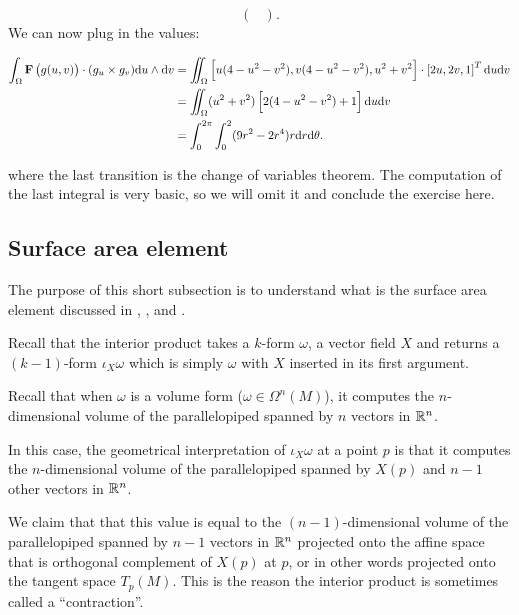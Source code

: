 \documentclass[11pt,a4paper]{article}
\begin{document}
\begin{solution}
\[\begin{pmatrix}
    \end{pmatrix}.
  \]
  We can now plug in the values:
  \begin{small}
  \begin{align*}
    \int_{\Omega}
    \vec F\del{g(u,v)} \cdot (g_u \times g_v) \du \wedge \dv &=
    \iint_{\Omega}
    \left[u (4 - u^2 - v^2),v (4 - u^2 - v^2),u^2 + v^2\right] \cdot
    \left[2u,2v,1\right]^T \du \dv \\ &=
    \iint_{\Omega} (u^2 + v^2) \left[2 (4 - u^2 - v^2) + 1\right] \du \dv
                                  \\&=
    \int_{0}^{2\pi} \int_{0}^{2} (9r^2 - 2r^4) r \dr \dtheta.
  \end{align*}
  \end{small}

  \noindent where the last transition is the change of variables theorem.
  The computation of the last integral is very basic,
  so we will omit it and conclude the exercise here.
\end{solution}

\subsection{Surface area element}
The purpose of this short subsection is to understand what is the
surface area element discussed in
,
, and
.

\begin{remark}
  Recall that the interior product takes a $k$-form $\omega$,
  a vector field $X$ and returns a $(k-1)$-form $\iota_X \omega$
  which is simply $\omega$ with $X$ inserted in its first argument.
  
  Recall that when $\omega$ is a volume form ($\omega \in \Omega^n(M)$),
  it computes the $n$-dimensional volume of the parallelopiped spanned by
  $n$ vectors in $\mathbb{R}^n$.

  In this case,
  the geometrical interpretation of $\iota_X \omega$ at a point $p$
  is that it computes the $n$-dimensional volume of the parallelopiped spanned
  by $X(p)$ and $n-1$ other vectors in $\mathbb{R}^n$.

  We claim that that this value is equal to the $(n-1)$-dimensional
  volume of the parallelopiped spanned by $n-1$ vectors in $\mathbb{R}^n$
  projected onto the affine space that is orthogonal complement of $X(p)$
  at $p$, or in other words projected onto the tangent space $T_p(M)$.
  This is the reason the interior product is sometimes called a ``contraction''.
\end{remark}
\end{document}
